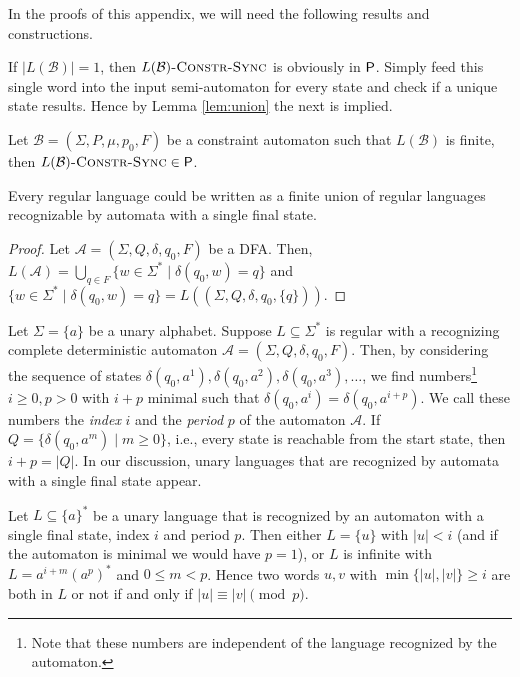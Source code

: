 \begin{toappendix}

In the proofs of this appendix, we will need the following results
and constructions.


If $|L(\mathcal B)| = 1$, then $L(\mathcal B)\textsc{-Constr-Sync}$
is obviously in $\textsf{P}$. Simply feed this single word into the input
semi-automaton for every state and check if a unique state results.
Hence by Lemma \ref{lem:union} the next is implied.

\begin{lemma}\label{lem:finite} 
 Let $\mathcal B = (\Sigma, P, \mu, p_0, F)$ be a constraint automaton
 such that $L(\mathcal B)$ is finite, then
 $L(\mathcal B)\textsc{-Constr-Sync} \in \textsf{P}$.
\end{lemma}



\begin{lemma}\label{lem:union_single_final_state}
 Every regular language could be written as a finite union of regular languages
 recognizable by automata with a single final state.
\end{lemma}
\begin{proof}
 Let $\mathcal A = (\Sigma, Q, \delta, q_0, F)$ be a DFA.
 Then, $L(\mathcal A) = \bigcup_{q \in F} \{ w \in \Sigma^* \mid \delta(q_0, w) = q\}$
 and $\{ w \in \Sigma^* \mid \delta(q_0, w) = q\} = L((\Sigma, Q, \delta, q_0, \{q\}))$.
\end{proof}

Let $\Sigma = \{a\}$ be a unary alphabet. Suppose $L \subseteq \Sigma^{\ast}$ is regular
with a recognizing complete deterministic automaton $\mathcal A = (\Sigma, Q, \delta, q_0, F)$. Then, by considering
the sequence of states $\delta(q_0, a^1), \delta(q_0, a^2), \delta(q_0, a^3), \ldots$, we find numbers\footnote{Note that these numbers are independent of the language recognized by the automaton.}
$i \ge 0, p > 0$ with $i+p$ minimal such that $\delta(q_0, a^i) = \delta(q_0, a^{i+p})$.
We call these numbers the \emph{index} $i$ and the \emph{period} $p$ of the automaton $\mathcal A$.
If $Q = \{\delta(q_0, a^m) \mid m \ge 0 \}$, i.e., every state is reachable from the start state, then  $i + p = |Q|$.
 In our discussion, unary languages that are recognized by
 automata with a single final state appear.
 
 \begin{lemma}
\label{lem::unary_single_final}
  Let $L \subseteq \{a\}^{\ast}$ be a unary language that is recognized
  by an automaton with a single final state, index $i$ and period $p$.
  Then either $L = \{u\}$ with $|u| < i$ (and if the automaton is minimal we would have $p = 1$),
  or $L$ is infinite with $L = a^{i+m}(a^p)^{\ast}$ and $0 \le m < p$. Hence
  two words $u,v$ with $\min\{|u|, |v|\} \ge i$ are both in $L$ or not if and only
  if $|u| \equiv |v| \pmod{p}$.
 \end{lemma}
 

\end{toappendix}
